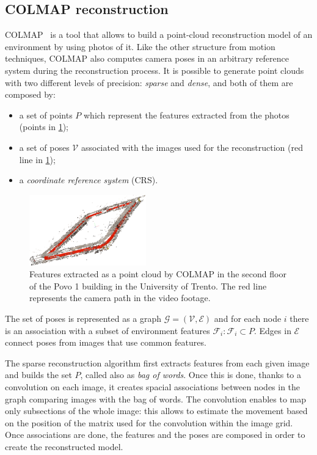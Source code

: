 \subsection{COLMAP reconstruction}
COLMAP~\cite{colmap} is a tool that allows to build a point-cloud reconstruction model of an environment by using photos of it.
Like the other structure from motion techniques, COLMAP also computes camera poses in an arbitrary reference system during the reconstruction process.
It is possible to generate point clouds with two different levels of precision: \emph{sparse} and \emph{dense}, and both of them are composed by:
\begin{itemize}
    \item a set of points $P$ which represent the features extracted from the photos (points in \cref{fig:features-colmap});
    \item a set of poses $\mathcal{V}$ associated with the images used for the reconstruction (red line in \cref{fig:features-colmap});
    \item a \emph{coordinate reference system} (CRS).
\end{itemize}

\begin{figure}[htbp]
    \begin{center}
        \includegraphics[width=0.45\textwidth]{./imgs/extracted_features_colmap.png}
    \end{center}
    \caption{Features extracted as a point cloud by COLMAP in the second floor of the Povo 1 building in the University of Trento. The red line represents the camera path in the video footage.}
    \label{fig:features-colmap}
\end{figure}

The set of poses is represented as a graph $\mathcal{G}=(\mathcal{V}, \mathcal{E})$ and for each node $i$ there is an association with a subset of environment features $\mathcal{F}_i : \mathcal{F}_i\subset P$. Edges in $\mathcal{E}$ connect poses from images that use common features.

The sparse reconstruction algorithm first extracts features from each given image and builds the set $P$, called also as \emph{bag of words}. Once this is done, thanks to a convolution on each image, it creates spacial associations between nodes in the graph comparing images with the bag of words. The convolution enables to map only subsections of the whole image: this allows to estimate the movement based on the position of the matrix used for the convolution within the image grid. Once associations are done, the features and the poses are composed in order to create the reconstructed model.

